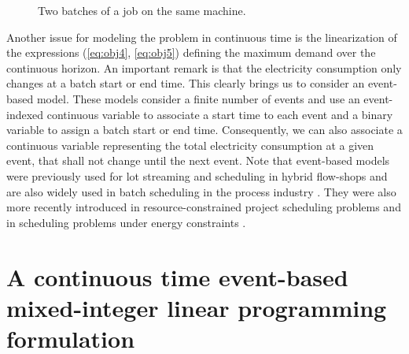 \begin{figure}[htbp]
\centering {}  
\caption{Two batches of a job on the same machine.}
\label{fig_contrex-1batch}
\end{figure}


Another issue for modeling the problem in continuous time is the
linearization of the expressions (\ref{eq:obj4}, \ref{eq:obj5})
defining the maximum demand over the continuous horizon. An important
remark is that the electricity consumption only changes at a batch
start or end time.  This clearly brings us to consider an event-based
model. These models consider a finite number of events and use an
event-indexed continuous variable to associate a start time to each
event and a binary variable to assign a batch start or end
time. Consequently, we can also associate a continuous variable
representing the total electricity consumption at a given event, that
shall not change until the next event.  Note that event-based models
were previously used for lot streaming and scheduling in hybrid
flow-shops \cite{defersha2012mathematical} and are also widely used in
batch scheduling in the process industry \cite{floudas2005mixed}. They
were also more recently introduced in resource-constrained project
scheduling problems \cite{KALM10d} and in scheduling problems under
energy constraints \cite{nataff2015}.

\section{A continuous time event-based mixed-integer linear programming formulation}
\label{sec:milp}

